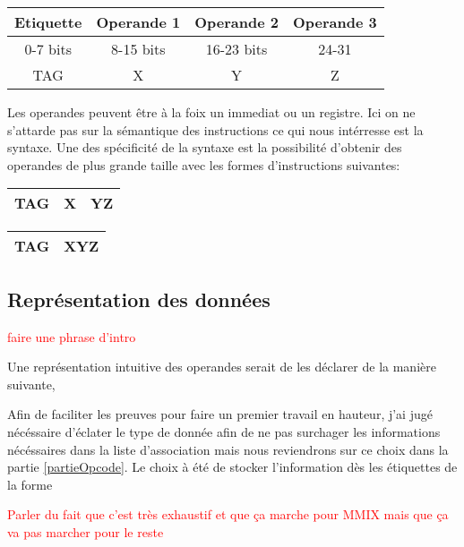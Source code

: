 \documentclass {article}
\newcommand{\codefrom}[3]
           {}
\theoremstyle{definition}
\theoremstyle{remark}
\newcommand{\todo}[1]{\textcolor{red}{#1}}
\begin{document}
\begin{tabular}{|c|c|c|c|}
  \hline
  Etiquette & Operande 1 & Operande 2 & Operande 3\\
  \hline
  0-7 bits & 8-15 bits & 16-23 bits & 24-31  \\
  \hline
  TAG & X & Y & Z \\
  \hline
\end{tabular}
Les operandes peuvent être à la foix un immediat ou un registre.
Ici on ne s'attarde pas sur la sémantique des instructions ce qui nous intérresse
est la syntaxe. Une des spécificité de la syntaxe est la possibilité d'obtenir des operandes
de plus grande taille avec les formes d'instructions suivantes:\\
\begin{tabular}{|c|c|c|}
  \hline 
  TAG & X & YZ \\
  \hline
\end{tabular}

\begin{tabular}{|c|c|}
  \hline 
  TAG & XYZ \\
  \hline
\end{tabular}





\subsection{Représentation des données}
\label{representation des donnees}
\todo{faire une phrase d'intro}

Une représentation intuitive des operandes serait de les déclarer de la manière suivante,


Afin de faciliter les preuves pour faire un premier travail en hauteur, j'ai jugé nécéssaire
d'éclater le type de donnée afin de ne pas surchager les informations nécéssaires dans la liste d'association
mais nous reviendrons sur ce choix dans la partie \ref{partieOpcode}.
Le choix à été de stocker l'information dès les étiquettes de la forme

\todo{Parler du fait que c'est très exhaustif et que ça marche pour MMIX mais que ça va pas marcher pour le reste}
\codefrom{src}{ast_instructions}{tag}
\end{document}
